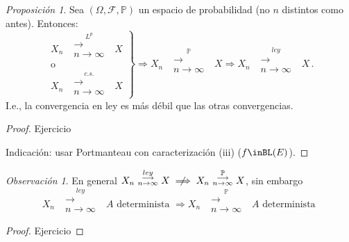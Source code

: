 \documentclass[letterpaper,11pt]{article} %
\def\espacio{\hspace{.25cm}\,}
\theoremstyle{defbreak}
\theoremstyle{propbreak}
\theoremstyle{remark}
\newtheorem{remark}{Observación}[subsection]
\theoremstyle{break}
\newtheorem{proposition}{Proposición}[subsection]
\def\ejercicio{\color{blue}Ejercicio\color{black}}
\def\gris{\color{mygray}}
\def\negro{\color{black}}
\begin{document}
\begin{proposition}
Sea $(\Omega,\mathcal{F},\mathbb{P})$ un espacio de probabilidad (no $n$ distintos como antes). Entonces:
$$\left.\begin{aligned}
X_n\mbox{ }\overset{L^p}{\substack{\longrightarrow \\n \to \infty}}\mbox{ }X \\ \mbox{o} \hspace{1cm} \\
X_n\mbox{ }\overset{c.s.}{\substack{\longrightarrow \\n \to \infty}}\mbox{ }X
\end{aligned}\right\} \Longrightarrow X_n\mbox{ }\overset{\mathbb{P}}{\substack{\longrightarrow \\n \to \infty}}\mbox{ }X \Longrightarrow X_n\mbox{ }\overset{ley}{\substack{\longrightarrow \\n \to \infty}}\mbox{ }X \, .$$
I.e., la convergencia en ley es más débil que las otras convergencias.
\end{proposition}
\begin{proof}
\ejercicio \gris

Indicación: usar Portmanteau con caracterización (iii) ($f\inBL(E)$). \negro
\end{proof}

\begin{remark}
En general $X_n\mbox{ }\overset{ley}{\substack{\longrightarrow \\n \to \infty}}\mbox{ }X \centernot\implies X_n\mbox{ }\overset{\mathbb{P}}{\substack{\longrightarrow \\n \to \infty}}\mbox{ }X$, sin embargo
$$ X_n\mbox{ }\overset{ley}{\substack{\longrightarrow \\n \to \infty}}\mbox{ }A \mbox{ determinista } \Longrightarrow X_n\mbox{ }\overset{\mathbb{P}}{\substack{\longrightarrow \\n \to \infty}}\mbox{ }A \mbox{ determinista }$$
\end{remark}
\begin{proof}
\ejercicio
\end{proof}
\end{document}
